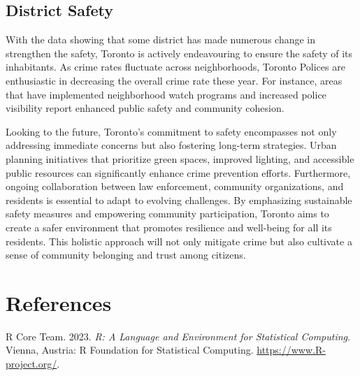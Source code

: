 \documentclass[
  letterpaper,
  DIV=11,
  numbers=noendperiod]{scrartcl}
\newlength{\cslhangindent}
\newlength{\cslentryspacingunit} %
\newenvironment{CSLReferences}[2] %
 {%
  \setlength{\parindent}{0pt}
  \ifodd #1
  \let\oldpar\par
  \def\par{\hangindent=\cslhangindent\oldpar}
  \fi
  \setlength{\parskip}{#2\cslentryspacingunit}
 }%
 {}
\begin{document}
\hypertarget{district-safety}{%
\subsection{District Safety}\label{district-safety}}

With the data showing that some district has made numerous change in
strengthen the safety, Toronto is actively endeavouring to ensure the
safety of its inhabitants. As crime rates fluctuate across
neighborhoods, Toronto Polices are enthusiastic in decreasing the
overall crime rate these year. For instance, areas that have implemented
neighborhood watch programs and increased police visibility report
enhanced public safety and community cohesion.

Looking to the future, Toronto's commitment to safety encompasses not
only addressing immediate concerns but also fostering long-term
strategies. Urban planning initiatives that prioritize green spaces,
improved lighting, and accessible public resources can significantly
enhance crime prevention efforts. Furthermore, ongoing collaboration
between law enforcement, community organizations, and residents is
essential to adapt to evolving challenges. By emphasizing sustainable
safety measures and empowering community participation, Toronto aims to
create a safer environment that promotes resilience and well-being for
all its residents. This holistic approach will not only mitigate crime
but also cultivate a sense of community belonging and trust among
citizens.

\newpage

\hypertarget{references}{%
\section*{References}\label{references}}

\hypertarget{refs}{}
\begin{CSLReferences}{1}{0}
\leavevmode{}%
R Core Team. 2023. \emph{R: A Language and Environment for Statistical
Computing}. Vienna, Austria: R Foundation for Statistical Computing.
\url{https://www.R-project.org/}.

\end{CSLReferences}
\end{document}
